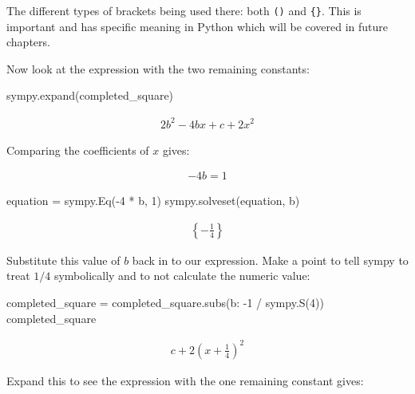 \begin{note}
The different types of brackets being used there: both \texttt{()} and \texttt{\{\}}. This is
important and has specific meaning in Python which will be covered in future
chapters.
\end{note}

Now look at the expression with the two remaining constants:

\begin{pyin}
sympy.expand(completed_square)
\end{pyin}

\begin{equation*}
\begin{split}\displaystyle 2 b^{2} - 4 b x + c + 2 x^{2}\end{split}
\end{equation*}

Comparing the coefficients of \(x\) gives:

\begin{equation*}
\begin{split}
  - 4 b = 1
\end{split}
\end{equation*}

\begin{pyin}
equation = sympy.Eq(-4 * b, 1)
sympy.solveset(equation, b)
\end{pyin}

\begin{equation*}
\begin{split}\displaystyle \left\{- \frac{1}{4}\right\}\end{split}
\end{equation*}

Substitute this value of \(b\) back in to our expression.
Make a point to tell sympy to treat \(1 / 4\) symbolically and to not
calculate the numeric value:

\begin{pyin}
completed_square = completed_square.subs({b: -1 / sympy.S(4)})
completed_square
\end{pyin}

\begin{equation*}
\begin{split}\displaystyle c + 2 \left(x + \frac{1}{4}\right)^{2}\end{split}
\end{equation*}

Expand this to see the expression with the one remaining constant gives:


